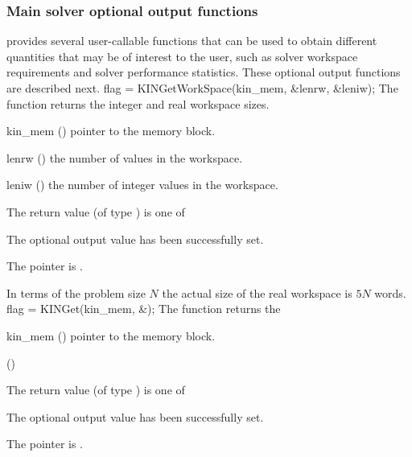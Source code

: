 \subsubsection{Main solver optional output functions}
{\kinsol} provides several user-callable functions that can be used to obtain
different quantities that may be of interest to the user, such as solver workspace
requirements and solver performance statistics.
These optional output functions are described next.
{
  flag = KINGetWorkSpace(kin\_mem, \&lenrw, \&leniw);
}
{
  The function  returns the
  {\kinsol} integer and real workspace sizes.
}
{
  \begin{args}
  \item[kin\_mem] ()
    pointer to the {\kinsol} memory block.
  \item[lenrw] ()
    the number of  values in the {\kinsol} workspace.
  \item[leniw] ()
    the number of integer values in the {\kinsol} workspace.
  \end{args}
}
{
  The return value  (of type ) is one of
  \begin{args}
  \item[\Id{KIN\_SUCCESS}] 
    The optional output value has been successfully set.
  \item[\Id{KIN\_MEM\_NULL}]
    The  pointer is .
  \end{args}
}
{
  In terms of the problem size $N$ the actual size of the real workspace 
  is $5 N$  words.
}
{
  flag = KINGet(kin\_mem, \&);
}
{
  The function  returns the
}
{
  \begin{args}
  \item[kin\_mem] ()
    pointer to the {\kinsol} memory block.
  \item[] (\id{})

  \end{args}
}
{
  The return value  (of type ) is one of
  \begin{args}
  \item[\Id{KIN\_SUCCESS}] 
    The optional output value has been successfully set.
  \item[\Id{KIN\_MEM\_NULL}]
    The  pointer is .
  \end{args}
}
